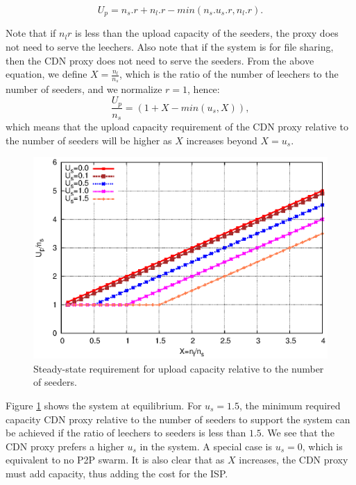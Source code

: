 \documentclass[paper]{ieice}
\begin{document}
\begin{equation}
        U_p = n_s.r + n_l.r - min(n_s.u_s.r, n_l.r).
\end{equation}

Note that if $n_lr$ is less than the upload capacity of the seeders, the proxy does not need to serve the leechers.
Also note that if the system is for file sharing, then the CDN proxy does not need to serve the seeders.
From the above equation, we define $X=\frac{n_l}{n_s}$, which is the ratio of the number of leechers to the number of seeders, and we normalize $r=1$, hence:
\begin{equation}
        \frac{U_p}{n_s} = (1 + X - min (u_s,X)),
\end{equation}
which means that the upload capacity requirement of the CDN proxy relative to the number of seeders will be higher as $X$ increases beyond $X = u_s$.

\begin{figure}[hb] 
\begin{center}
\includegraphics[scale=0.65]{graphs/stable-steady-state.eps}
\end{center}
\caption{Steady-state requirement for upload capacity relative to the number of seeders.}
\label{fig:steadystate}
\vspace{-2mm}
\end{figure}

Figure \ref{fig:steadystate} shows the system at equilibrium.
For $u_s=1.5$, the minimum required capacity CDN proxy relative to the number of seeders to support the system can be achieved if the ratio of leechers to seeders is less than $1.5$.
We see that the CDN proxy prefers a higher $u_s$ in the system.
A special case is $u_s = 0$, which is equivalent to no P2P swarm.
It is also clear that as $X$ increases, the CDN proxy must add capacity, thus adding the cost for the ISP.
\end{document}
